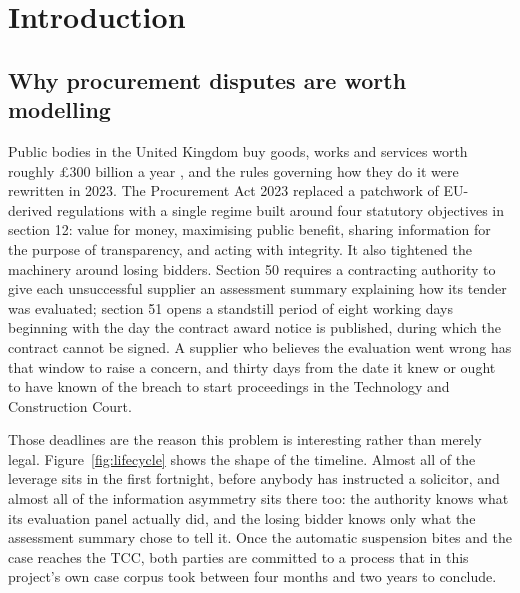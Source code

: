 \chapter{Introduction}
\label{ch:intro}

\section{Why procurement disputes are worth modelling}
\label{sec:context}

Public bodies in the United Kingdom buy goods, works and services worth roughly
\pounds300 billion a year \cite{cabinetoffice2020}, and the rules governing how
they do it were rewritten in 2023. The Procurement Act 2023 \cite{pa2023} replaced a patchwork of
EU-derived regulations with a single regime built around four statutory
objectives in section 12: value for money, maximising public benefit, sharing
information for the purpose of transparency, and acting with integrity. It also
tightened the machinery around losing bidders. Section 50 requires a contracting
authority to give each unsuccessful supplier an assessment summary explaining how
its tender was evaluated; section 51 opens a standstill period of eight working
days beginning with the day the contract award notice is published, during which
the contract cannot be signed. A supplier who believes the evaluation went wrong
has that window to raise a concern, and thirty days from the date it knew or
ought to have known of the breach to start proceedings in the Technology and
Construction Court.

Those deadlines are the reason this problem is interesting rather than merely
legal. Figure~\ref{fig:lifecycle} shows the shape of the timeline. Almost all of
the leverage sits in the first fortnight, before anybody has instructed a
solicitor, and almost all of the information asymmetry sits there too: the
authority knows what its evaluation panel actually did, and the losing bidder
knows only what the assessment summary chose to tell it. Once the automatic
suspension bites and the case reaches the TCC, both parties are committed to a
process that in this project's own case corpus took between four months and two
years to conclude.

